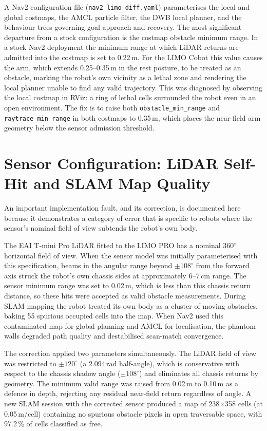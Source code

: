 A Nav2 configuration file (\texttt{nav2\_limo\_diff.yaml}) parameterises the local and
global costmaps, the AMCL particle filter, the DWB local planner, and the behaviour
trees governing goal approach and recovery. The most significant departure from a stock
configuration is the costmap obstacle minimum range. In a stock Nav2 deployment the
minimum range at which LiDAR returns are admitted into the costmap is set to 0.22\,m.
For the LIMO Cobot this value causes the arm, which extends 0.25--0.35\,m in the
rest posture, to be treated as an obstacle, marking the robot's own vicinity as a
lethal zone and rendering the local planner unable to find any valid trajectory. This
was diagnosed by observing the local costmap in RViz: a ring of lethal cells
surrounded the robot even in an open environment. The fix is to raise both
\texttt{obstacle\_min\_range} and \texttt{raytrace\_min\_range} in both costmaps to
0.35\,m, which places the near-field arm geometry below the sensor admission threshold.

\section{Sensor Configuration: LiDAR Self-Hit and SLAM Map Quality}
An important implementation fault, and its correction, is documented here because it
demonstrates a category of error that is specific to robots where the sensor's nominal
field of view subtends the robot's own body.

The EAI T-mini Pro LiDAR fitted to the LIMO PRO has a nominal $360^{\circ}$ horizontal
field of view. When the sensor model was initially parameterised with this specification,
beams in the angular range beyond $\pm108^{\circ}$ from the forward axis struck the
robot's own chassis sides at approximately 6--7\,cm range. The sensor minimum range was
set to 0.02\,m, which is less than this chassis return distance, so these hits were
accepted as valid obstacle measurements. During SLAM mapping the robot treated its own
body as a cluster of moving obstacles, baking 55 spurious occupied cells into the map.
When Nav2 used this contaminated map for global planning and AMCL for localisation,
the phantom walls degraded path quality and destabilised scan-match convergence.

The correction applied two parameters simultaneously. The LiDAR field of view was
restricted to $\pm120^{\circ}$ (a 2.094\,rad half-angle), which is conservative
with respect to the chassis shadow angle ($\pm108^{\circ}$) and eliminates all chassis
returns by geometry. The minimum valid range was raised from 0.02\,m to 0.10\,m as
a defence in depth, rejecting any residual near-field return regardless of angle.
A new SLAM session with the corrected sensor produced a map of 238$\times$358 cells
(at 0.05\,m/cell) containing no spurious obstacle pixels in open traversable space,
with 97.2\,\% of cells classified as free.

